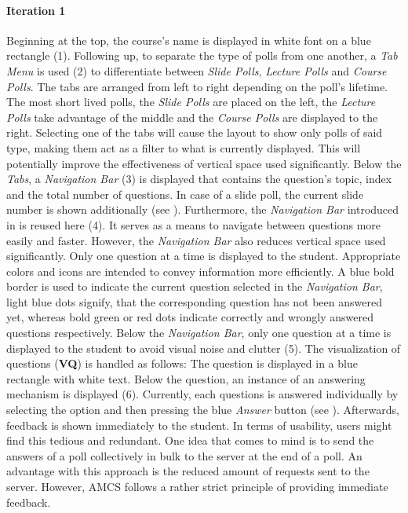 \paragraph{Iteration 1}
Beginning at the top, the course's name is displayed in white font on a blue rectangle (1). Following up, to separate the type of polls from one another, a \emph{Tab Menu} is used (2) to differentiate between \emph{Slide Polls}, \emph{Lecture Polls} and \emph{Course Polls}. The tabs are arranged from left to right depending on the poll's lifetime. The most short lived polls, the \emph{Slide Polls} are placed on the left, the \emph{Lecture Polls} take advantage of the middle and the \emph{Course Polls} are displayed to the right. Selecting one of the tabs will cause the layout to show only polls of said type, making them act as a filter to what is currently displayed. This will potentially improve the effectiveness of vertical space used significantly. 
Below the \emph{Tabs}, a \emph{Navigation Bar} (3) is displayed that contains the question's topic, index and the total number of questions. In case of a slide poll, the current slide number is shown additionally (see ).
Furthermore, the \emph{Navigation Bar} introduced in  is reused here (4). It serves as a means to navigate between questions more easily and faster. However, the \emph{Navigation Bar} also reduces vertical space used significantly. Only one question at a time is displayed to the student.
\newline
\newline
Appropriate colors and icons are intended to convey information more efficiently. A blue bold border is used to indicate the current question selected in the \emph{Navigation Bar}, light blue dots signify, that the corresponding question has not been answered yet, whereas bold green or red dots indicate correctly and wrongly answered questions respectively. 
Below the \emph{Navigation Bar}, only one question at a time is displayed to the student to avoid visual noise and clutter (5). The visualization of questions (\textbf{VQ}) is handled as follows: The question is displayed in a blue rectangle with white text. Below the question, an instance of an answering mechanism is displayed (6). 
Currently, each questions is answered individually by selecting the option and then pressing the blue \emph{Answer} button (see ). Afterwards, feedback is shown immediately to the student. In terms of usability, users might find this tedious and redundant. One idea that comes to mind is to send the answers of a poll collectively in bulk to the server at the end of a poll. An advantage with this approach is the reduced amount of requests sent to the server. However, AMCS follows a rather strict principle of providing immediate feedback.
